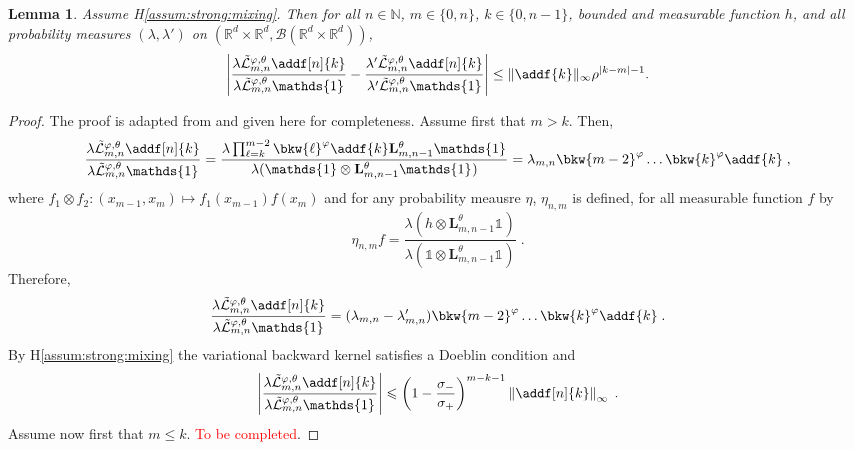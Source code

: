 \documentclass{article}
\newtheorem{lemma}[theorem]{Lemma}
\newcommand{\intvect}[2]{\{ #1, #2 \}}
\newcommand{\nset}{\mathbb{N}}
\newcommand{\1}{\mathbbm{1}}
\newcommand{\uk}[1]{\mathbf{L}_{#1}}
\def\1{\mathds{1}}
\newcommand{\eqsp}{\;}
\begin{document}
\begin{lemma} \label{lem:geo:bound}
Assume H\ref{assum:strong:mixing}. Then for all $n \in \nset$, $m \in \intvect{0}{n}$, $k \in \intvect{0}{n - 1}$, bounded and measurable function $h$, and all probability measures $(\lambda, \lambda')$ on $(\mathbb{R}^d\times\mathbb{R}^d,\mathcal{B}(\mathbb{R}^d\times \mathbb{R}^d))$, 
$$
\left|\frac{\lambda \tilde{\mathcal{L}}^{\varphi,\theta}_{m, n} \addf[n]{k}}{\lambda \tilde{\mathcal{L}}^{\varphi,\theta}_{m, n} \1_{}} - \frac{\lambda' \tilde{\mathcal{L}}^{\varphi,\theta}_{m, n} \addf[n]{k}}{\lambda'  \tilde{\mathcal{L}}^{\varphi,\theta}_{m, n} \1} \right| \leq \| \addf{k} \|_\infty \rho^{|k - m| - 1}. 
$$
\end{lemma}
\begin{proof}
The proof is adapted from  \cite[Lemma~D.3]{gloaguen2019pseudo} and given here for completeness. Assume first that $m>k$. Then,
$$
\frac{\lambda \tilde{\mathcal{L}}^{\varphi,\theta}_{m, n} \addf[n]{k}}{\lambda \tilde{\mathcal{L}}^{\varphi,\theta}_{m, n} \1_{}} = \frac{\lambda \prod_{\ell = k}^{m-2}\bkw{\ell}^\varphi\addf{k}\uk{m, n-1}^\theta\1_{}}{\lambda(\1\otimes \uk{m, n-1}^\theta\1_{})} = \lambda_{m,n}\bkw{m-2}^\varphi \ldots \bkw{k}^\varphi\addf{k}\eqsp,
$$
where $f_1\otimes f_2: (x_{m-1},x_m) \mapsto f_1(x_{m-1})f(x_m)$ and for any probability meausre $\eta$, $\eta_{n,m}$ is defined, for all measurable function $f$ by
$$
\eta_{n,m}f = \frac{\lambda (h\otimes \uk{m, n-1}^\theta\1_{})}{\lambda (\1\otimes \uk{m, n-1}^\theta\1_{})}\eqsp.
$$
Therefore,
$$
\frac{\lambda \tilde{\mathcal{L}}^{\varphi,\theta}_{m, n} \addf[n]{k}}{\lambda \tilde{\mathcal{L}}^{\varphi,\theta}_{m, n} \1_{}} = (\lambda_{m,n}-\lambda'_{m,n})\bkw{m-2}^\varphi \ldots \bkw{k}^\varphi\addf{k}\eqsp.
$$
By H\ref{assum:strong:mixing} the variational backward kernel satisfies a Doeblin condition and 
$$
\left|\frac{\lambda \tilde{\mathcal{L}}^{\varphi,\theta}_{m, n} \addf[n]{k}}{\lambda \tilde{\mathcal{L}}^{\varphi,\theta}_{m, n} \1_{}}\right|\leqslant  \left(1-\frac{\sigma_-}{\sigma_+}\right)^{m-k-1}\left\|\addf[n]{k}\right\|_\infty\eqsp.
$$
Assume now first that $m\leqslant k$. \textcolor{red}{To be completed}.

\end{proof}
\end{document}
